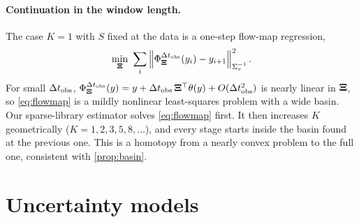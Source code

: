 \paragraph{Continuation in the window length.} The case $K=1$ with $S$ fixed at the data is a one-step flow-map regression,
\begin{equation}\label{eq:flowmap}
  \min_{\Xib}\ \sum_i\norm{\Phi^{\dto}_{\Xib}(y_i)-y_{i+1}}^2_{\Sigma_x^{-1}} .
\end{equation}
For small $\Delta t_{\mathrm{obs}}$, $\Phi^{\Delta t_{\mathrm{obs}}}_{\bm{\Xi}}(y)=y+\Delta t_{\mathrm{obs}}\,\bm{\Xi}^\top\theta(y)+O(\Delta t_{\mathrm{obs}}^2)$ is nearly linear in $\bm{\Xi}$, so \eqref{eq:flowmap} is a mildly nonlinear least-squares problem with a wide basin. Our sparse-library estimator solves \eqref{eq:flowmap} first. It then increases $K$ geometrically ($K=1,2,3,5,8,\dots$), and every stage starts inside the basin found at the previous one. This is a homotopy from a nearly convex problem to the full one, consistent with \cref{prop:basin}.

\section{Uncertainty models}\label{sec:uq-theory}

